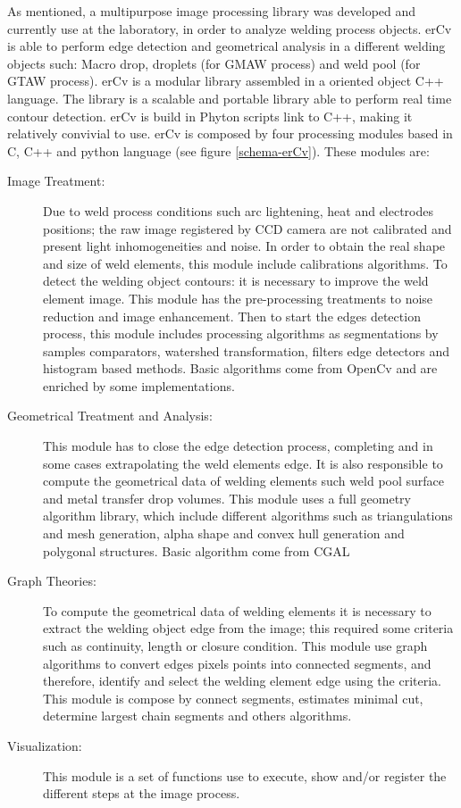 \begin{Segmentation}
As mentioned, a multipurpose image processing library was developed
 and currently use at the laboratory, in order to analyze welding
 process objects.
erCv is able to perform edge detection and geometrical analysis
 in a different welding objects such: Macro drop, droplets 
(for GMAW process) \cite{ROMERO1} and weld pool (for GTAW process).
erCv is a modular library assembled in a oriented object C++ 
language. The library is a scalable and portable library able 
to perform real time contour detection. erCv is build in Phyton 
scripts link to C++, making it relatively convivial to use.
erCv is composed by four processing modules based in C,  
C++ and python language (see figure \ref{schema-erCv}). These modules are: 
\begin{description}
\item[Image Treatment:] Due to weld process conditions such
 arc lightening, heat and electrodes positions; the raw image
 registered by CCD camera are not calibrated and present light
 inhomogeneities and noise. In order to obtain the real shape
 and size of weld elements, this module include calibrations
 algorithms. To detect the welding object contours: it is necessary
 to improve the weld element image. This module has the pre-processing
 treatments to noise reduction and image enhancement. Then to start
 the edges detection process, this module includes processing 
 algorithms as segmentations by samples comparators, watershed
 transformation, filters edge detectors and histogram based
 methods.  Basic algorithms come from OpenCv \cite{OPENCV} and are enriched 
 by some implementations.
\item[Geometrical Treatment and Analysis:] This module has 
to close the edge detection process, completing and in some 
cases extrapolating the weld elements edge. It is also 
responsible to compute the geometrical data of welding 
elements such weld pool surface and metal transfer drop 
volumes. This module uses a full geometry algorithm library,
 which include different algorithms such as triangulations 
and mesh generation, alpha shape and convex hull generation
 and polygonal structures. Basic algorithm come from CGAL \cite{CGAL} 
\item[Graph Theories:] To compute the geometrical data of
 welding elements it is necessary to extract the welding 
object edge from the image; this required some criteria 
such as continuity, length or closure condition.  This module 
use graph algorithms to convert edges pixels points into 
connected segments, and therefore, identify and select the 
welding element edge using the criteria. This module is compose
 by connect segments, estimates minimal cut, determine largest
 chain segments and others algorithms. 
\item[Visualization:] This module is a set of functions use
 to execute, show and/or register the different steps at the
 image process.
\end{description}


\end{Segmentation}

